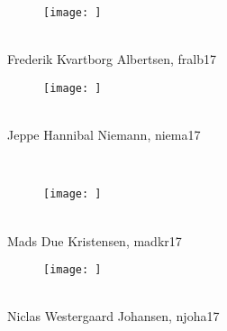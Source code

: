 \documentclass[../main.tex]{subfiles}
\begin{document}
\noindent
\begin{minipage}{1\textwidth}
\begin{center}

\begin{minipage}{0.5\textwidth}
\begin{flushleft} \footnotesize
\begin{center}
\begin{figure}[H]
 \centering
  \texttt{[image: ]}
   \end{figure}
\underline{\hspace{6cm}}\\
Frederik Kvartborg Albertsen, fralb17\\
\end{center}
\end{flushleft}
\end{minipage}%
\begin{minipage}{0.5\textwidth}
\begin{flushright} \footnotesize
\begin{center}
\begin{figure}[H]
 \centering
  \texttt{[image: ]}
   \end{figure}
\underline{\hspace{6cm}}\\
Jeppe Hannibal Niemann, niema17\\
\end{center}
\end{flushright}
\end{minipage}\\

\vskip 0.2in

\begin{minipage}{0.5\textwidth}
\begin{flushleft} \footnotesize
\begin{center}
\begin{figure}[H]
 \centering
  \texttt{[image: ]}
   \end{figure}
\underline{\hspace{6cm}}\\
Mads Due Kristensen, madkr17\
\end{center}
\end{flushleft}
\end{minipage}%
\begin{minipage}{0.5\textwidth}
\begin{flushright} \footnotesize
\begin{center}
\begin{figure}[H]
 \centering
  \texttt{[image: ]}
   \end{figure}
\underline{\hspace{6cm}}\\
Niclas Westergaard Johansen, njoha17\\
\end{center}
\end{flushright}
\end{minipage}\\


\end{center}
\end{minipage}
\end{document}
